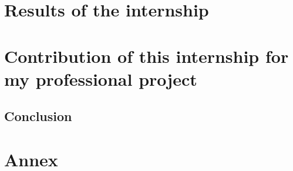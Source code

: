 \documentclass[a4paper, 11pt, oneside, oldfontcommands]{memoir}
\newcounter{th}[chapter]
\begin{document}




\part{Results of the internship}




% 


\part{Contribution of this internship for my professional project}



\chapter*{Conclusion}
\newpage

\part*{Annex}
\appendix



% 

\nocite{*}
%
\newpage
~\\
\newpage
 \listoffigures
 \printindex
 
  
\end{document}
